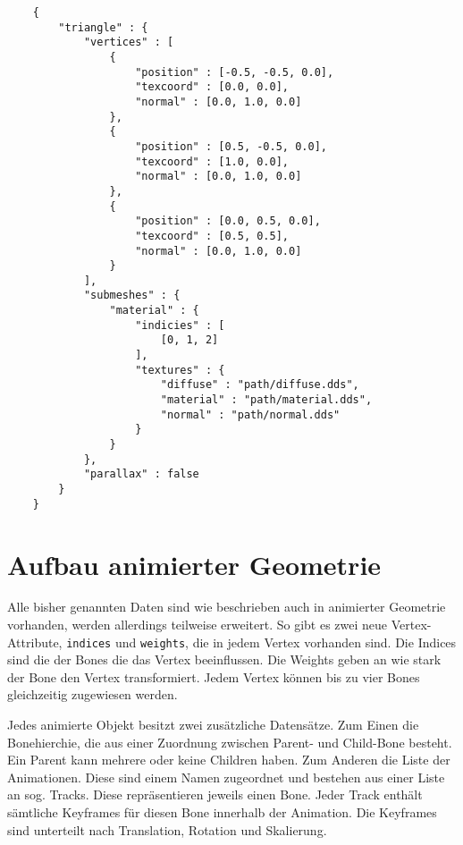 \begin{lstlisting}
    {
        "triangle" : {
            "vertices" : [
                {
                    "position" : [-0.5, -0.5, 0.0],
                    "texcoord" : [0.0, 0.0],
                    "normal" : [0.0, 1.0, 0.0]
                },
                {
                    "position" : [0.5, -0.5, 0.0],
                    "texcoord" : [1.0, 0.0],
                    "normal" : [0.0, 1.0, 0.0]
                },
                {
                    "position" : [0.0, 0.5, 0.0],
                    "texcoord" : [0.5, 0.5],
                    "normal" : [0.0, 1.0, 0.0]
                }
            ],
            "submeshes" : {
                "material" : {
                    "indicies" : [
                        [0, 1, 2]
                    ],
                    "textures" : {
                        "diffuse" : "path/diffuse.dds",
                        "material" : "path/material.dds",
                        "normal" : "path/normal.dds"
                    }
                }
            },
            "parallax" : false
        }
    }
\end{lstlisting}

\section{Aufbau animierter Geometrie}
Alle bisher genannten Daten sind wie beschrieben auch in animierter Geometrie vorhanden, werden allerdings teilweise erweitert.
So gibt es zwei neue Vertex-Attribute, \texttt{indices} und \texttt{weights}, die in jedem Vertex vorhanden sind. Die Indices sind die der Bones die das Vertex beeinflussen. Die Weights geben an wie stark der Bone den Vertex transformiert. Jedem Vertex können bis zu vier Bones gleichzeitig zugewiesen werden.

Jedes animierte Objekt besitzt zwei zusätzliche Datensätze. Zum Einen die Bonehierchie, die aus einer Zuordnung zwischen Parent- und Child-Bone besteht. Ein Parent kann mehrere oder keine Children haben. Zum Anderen die Liste der Animationen. Diese sind einem Namen zugeordnet und bestehen aus einer Liste an sog. Tracks. Diese repräsentieren jeweils einen Bone. Jeder Track enthält sämtliche Keyframes für diesen Bone innerhalb der Animation. Die Keyframes sind unterteilt nach Translation, Rotation und Skalierung.
